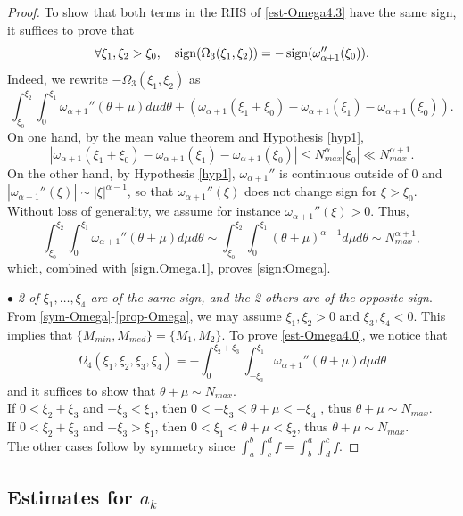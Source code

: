 \documentclass{amsart}
\theoremstyle{definition}
\theoremstyle{remark}
\numberwithin{equation}{section}
\def\sign{\mathop{\rm sign}\nolimits}
\begin{document}
\begin{proof}
  To show that both terms in the RHS of \eqref{est-Omega4.3} have the same sign, it suffices to prove that
 \begin{equation} \label{sign:Omega}
  \forall \xi_1,\xi_2>\xi_0, \quad  \sign(\Omega_3(\xi_1,\xi_2)) = -\sign(\omega_{\alpha+1}''(\xi_0)).
 \end{equation}
  Indeed, we rewrite $-\Omega_3(\xi_1,\xi_2)$ as 
  \begin{equation} \label{sign.Omega.1}
  \int_{\xi_0}^{\xi_2}\int_0^{\xi_1}\omega_{\alpha+1}''( \theta+\mu) d\mu d\theta +\left(\omega_{\alpha+1}(\xi_1+\xi_0)-\omega_{\alpha+1}(\xi_1)-\omega_{\alpha+1}(\xi_0)\right).
  \end{equation}
  On one hand, by the mean value theorem and Hypothesis \ref{hyp1},
  \[ \left|\omega_{\alpha+1}(\xi_1+\xi_0)-\omega_{\alpha+1}(\xi_1)-\omega_{\alpha+1}(\xi_0) \right| \le N_{max}^{\alpha} |\xi_0| \ll N_{max}^{\alpha+1} .\]
 On the other hand, by Hypothesis \ref{hyp1}, $\omega_{\alpha+1}'' $ is continuous outside of $0$ and $|\omega_{\alpha+1}''(\xi) | \sim |\xi|^{\alpha-1}$, so that $\omega_{\alpha+1}'' (\xi)$ does not change sign for $\xi>\xi_0$. Without loss of generality, we assume for instance $\omega_{\alpha+1}'' (\xi)>0$. Thus, 
 \[ \int_{\xi_0}^{\xi_2}\int_0^{\xi_1}\omega_{\alpha+1}''( \theta+\mu) d\mu d\theta \sim \int_{\xi_0}^{\xi_2}\int_0^{\xi_1}( \theta+\mu)^{\alpha-1} d\mu d\theta \sim N_{max}^{\alpha+1} ,\]
 which, combined with \eqref{sign.Omega.1}, proves \eqref{sign:Omega}.
  
  \noindent
  \textit{$\bullet$ 2 of $\xi_1,\ldots ,\xi_4$ are of the same sign, and the 2 others are of the opposite sign}. From \eqref{sym-Omega}-\eqref{prop-Omega}, we may assume $\xi_1,\xi_2>0$ and $\xi_3,\xi_4<0$. This implies that $\{M_{min},M_{med}\} = \{M_1,M_2\}$. To prove \eqref{est-Omega4.0}, we notice that
  $$
  \Omega_4(\xi_1,\xi_2,\xi_3,\xi_4) = -\int_0^{\xi_2+\xi_3}\int_{-\xi_3}^{\xi_1} \omega_{\alpha+1}''(\theta+\mu)d\mu d\theta
  $$
  and it suffices to show that $\theta+\mu \sim N_{max}$.\\
  If $0 < \xi_2+\xi_3$ and $-\xi_3<\xi_1$, then $0<-\xi_3<\theta+\mu <-\xi_4$ , thus $\theta+\mu \sim N_{max}$.\\
  If $0 < \xi_2+\xi_3$ and $-\xi_3>\xi_1$, then $0<\xi_1 < \theta+\mu < \xi_2$, thus $\theta+\mu \sim N_{max}$.\\
  The other cases follow by symmetry since $\int_a^b\int_c^d f = \int_b^a\int_d^c f$.  
\end{proof}

\subsection{Estimates for $a_k$}
\end{document}
